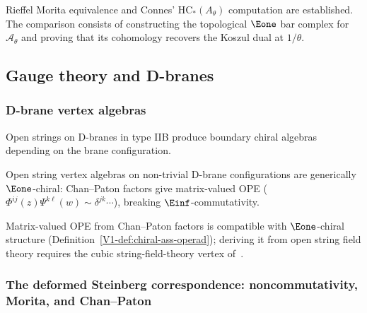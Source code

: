 \begin{remark}
Rieffel Morita equivalence and Connes' $\mathrm{HC}_*(A_\theta)$ computation are established. The comparison consists of constructing the topological $\Eone$ bar complex for $\mathcal{A}_\theta$ and proving that its cohomology recovers the Koszul dual at $1/\theta$.
\end{remark}


\subsection{Gauge theory and D-branes}
\label{sec:gauge-d-branes}
\subsubsection{D-brane vertex algebras}

\begin{construction}\label{constr:open-string-voa}
Open strings on D-branes in type IIB produce boundary chiral algebras depending on the brane configuration.
\end{construction}

\begin{remark}\label{rem:dbrane-e1}
Open string vertex algebras on non-trivial D-brane configurations are generically $\Eone$-chiral: Chan--Paton factors give matrix-valued OPE ($\Phi^{ij}(z)\Psi^{k\ell}(w) \sim \delta^{jk}\cdots$), breaking $\Einf$-commutativity.
\end{remark}

\begin{remark}
Matrix-valued OPE from Chan--Paton factors is compatible with $\Eone$-chiral structure (Definition~\ref*{V1-def:chiral-ass-operad}); deriving it from open string field theory requires the cubic string-field-theory vertex of~\cite{Zwi93}.
\end{remark}



\subsubsection{The deformed Steinberg correspondence: noncommutativity, Morita, and Chan--Paton}
\label{sec:deformed-steinberg}

